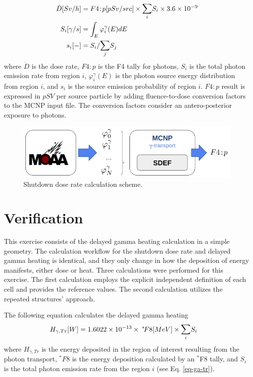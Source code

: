 \begin{align}
\dot{D}[Sv/h] &=  F4\!:\!p [pSv/src] \times \mathlarger{\sum}_i S_i \times 3.6 \times 10^{-9} \label{eq-dose} \\
S_i[\gamma/s] &= \int_{E} \varphi^\gamma_i(E) dE \\
s_i [-] &= S_i / \mathlarger{\sum}_j S_j
\end{align}
where $\dot{D}$ is the dose rate, $F4\!\!:\!\!p$ is the F4 tally for photons, $S_i$ is the total photon emission rate from region $i$, $\varphi^\gamma_i(E)$ is the photon source energy distribution from region $i$, and $s_i$ is the source emission probability of region $i$.
$F4\!\!:\!\!p$ result is expressed in $pSV$ per source particle by adding fluence-to-dose conversion factors \cite{icrp_116} to the MCNP input file.
The conversion factors consider an antero-posterior exposure to photons.

\begin{figure}[htbp!]
  \begin{center}
    \includegraphics[width=0.85\linewidth]{figures/dose-flow}
  \end{center}
  \caption{Shutdown dose rate calculation scheme.}
  \label{fig:workflow_4}
\end{figure}


\section{Verification}
\label{sec:verif}

This exercise consists of the delayed gamma heating calculation in a simple geometry.
The calculation workflow for the shutdown dose rate and delayed gamma heating is identical, and they only change in how the deposition of energy manifests, either dose or heat.
Three calculations were performed for this exercise.
The first calculation employs the explicit independent definition of each cell and provides the reference values.
The second calculation utilizes the repeated structures' approach.

The following equation calculates the delayed gamma heating
\begin{align}
H_{\gamma, Tr} [W] &= 1.6022 \times 10^{-13} \times \: ^* \! F8 [MeV] \times \mathlarger{\sum}_i S_i
\end{align}
where $H_{\gamma, Tr}$ is the energy deposited in the region of interest resulting from the photon transport, $^\ast F8$ is the energy deposition calculated by an $^\ast$F8 tally, and $S_i$ is the total photon emission rate from the region $i$ (see Eq. \ref{eq-ga-tr}).

